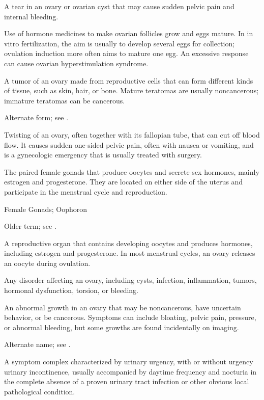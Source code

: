  A tear in an ovary or ovarian cyst that may cause sudden pelvic pain and internal bleeding.

 Use of hormone medicines to make ovarian follicles grow and eggs mature. In in vitro fertilization, the aim is usually to develop several eggs for collection; ovulation induction more often aims to mature one egg. An excessive response can cause ovarian hyperstimulation syndrome.

 A tumor of an ovary made from reproductive cells that can form different kinds of tissue, such as skin, hair, or bone. Mature teratomas are usually noncancerous; immature teratomas can be cancerous.

 Alternate form; see .

 Twisting of an ovary, often together with its fallopian tube, that can cut off blood flow. It causes sudden one-sided pelvic pain, often with nausea or vomiting, and is a gynecologic emergency that is usually treated with surgery.

 The paired female gonads that produce oocytes and secrete sex hormones, mainly estrogen and progesterone. They are located on either side of the uterus and participate in the menstrual cycle and reproduction.

\synonyms
Female Gonads; Oophoron

 Older term; see .

 A reproductive organ that contains developing oocytes and produces hormones, including estrogen and progesterone. In most menstrual cycles, an ovary releases an oocyte during ovulation.

 Any disorder affecting an ovary, including cysts, infection, inflammation, tumors, hormonal dysfunction, torsion, or bleeding.

 An abnormal growth in an ovary that may be noncancerous, have uncertain behavior, or be cancerous. Symptoms can include bloating, pelvic pain, pressure, or abnormal bleeding, but some growths are found incidentally on imaging.

 Alternate name; see .

 A symptom complex characterized by urinary urgency, with or without urgency urinary incontinence, usually accompanied by daytime frequency and nocturia in the complete absence of a proven urinary tract infection or other obvious local pathological condition.

